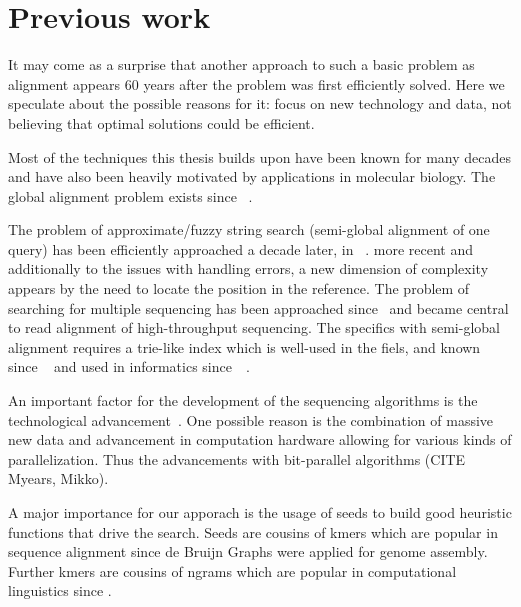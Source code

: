 \section{Previous work}

It may come as a surprise that another approach to such a basic problem as
alignment appears 60 years after the problem was first efficiently solved. Here
we speculate about the possible reasons for it: focus on new technology and
data, not believing that optimal solutions could be efficient.


Most of the techniques this thesis builds upon have been known for many decades
and have also been heavily motivated by applications in molecular biology. The
global alignment problem exists since
\citeyear{vintsyuk1968speech}~\cite{vintsyuk1968speech,needleman1970general}.

The problem of approximate/fuzzy string search (semi-global alignment of one
query) has been efficiently approached a decade later, in
\citeyear{sellers1980theory}~\cite{sellers1980theory,smith1981identification}.
more recent and additionally to the issues with handling errors, a new dimension
of complexity appears by the need to locate the position in the reference. The
problem of searching for multiple sequencing has been approached
since\citeyear{pearson1988improved}~\cite{pearson1988improved} and became
central to read alignment of high-throughput sequencing. The specifics with
semi-global alignment requires a trie-like index which is well-used in the
fiels, and known since
\citeyear{thue1912gegenseitige}~\cite{thue1912gegenseitige} and used in
informatics since~\citeyear{de1959file}~\cite{de1959file}.

An important factor for the development of the sequencing algorithms is the
technological advancement~\cite{alser2021technology}. One possible reason is the
combination of massive new data and advancement in computation hardware allowing
for various kinds of parallelization. Thus the advancements with bit-parallel
algorithms (CITE Myears, Mikko).

A major importance for our apporach is the usage of seeds to build good
heuristic functions that drive the \A search. Seeds are cousins of kmers which
are popular in sequence alignment since de Bruijn Graphs were applied for genome
assembly. Further kmers are cousins of ngrams which are popular in computational
linguistics since .

